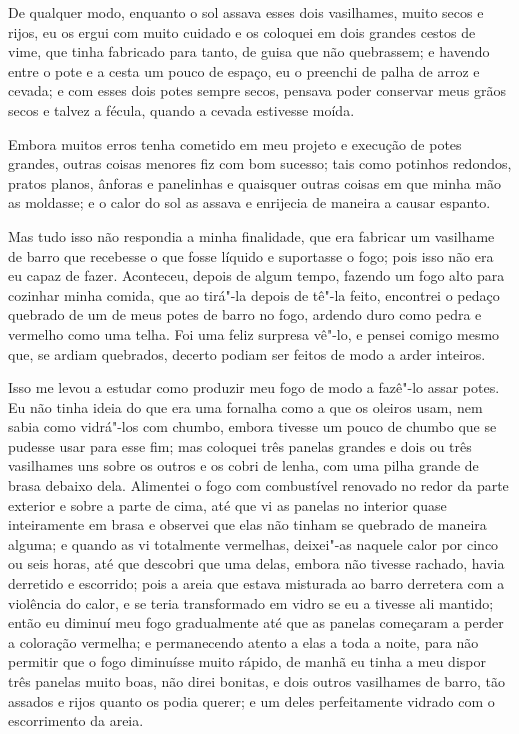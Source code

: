De qualquer modo, enquanto o sol assava esses dois vasilhames, muito
secos e rijos, eu os ergui com muito cuidado e os coloquei em dois
grandes cestos de vime, que tinha fabricado para tanto, de guisa que não
quebrassem; e havendo entre o pote e a cesta um pouco de espaço, eu o
preenchi de palha de arroz e cevada; e com esses dois potes sempre
secos, pensava poder conservar meus grãos secos e talvez a fécula,
quando a cevada estivesse moída.

Embora muitos erros tenha cometido em meu projeto e execução de potes
grandes, outras coisas menores fiz com bom sucesso; tais como potinhos
redondos, pratos planos, ânforas e panelinhas e quaisquer outras coisas
em que minha mão as moldasse; e o calor do sol as assava e enrijecia de
maneira a causar espanto.

Mas tudo isso não respondia a minha finalidade, que era fabricar um
vasilhame de barro que recebesse o que fosse líquido e suportasse o
fogo; pois isso não era eu capaz de fazer. Aconteceu, depois de algum
tempo, fazendo um fogo alto para cozinhar minha comida, que ao tirá"-la
depois de tê"-la feito, encontrei o pedaço quebrado de um de meus potes
de barro no fogo, ardendo duro como pedra e vermelho como uma telha. Foi
uma feliz surpresa vê"-lo, e pensei comigo mesmo que, se ardiam
quebrados, decerto podiam ser feitos de modo a arder inteiros.

Isso me levou a estudar como produzir meu fogo de modo a fazê"-lo assar
potes. Eu não tinha ideia do que era uma fornalha como a que os oleiros
usam, nem sabia como vidrá"-los com chumbo, embora tivesse um pouco de
chumbo que se pudesse usar para esse fim; mas coloquei três panelas
grandes e dois ou três vasilhames uns sobre os outros e os cobri de
lenha, com uma pilha grande de brasa debaixo dela. Alimentei o fogo com
combustível renovado no redor da parte exterior e sobre a parte de cima,
até que vi as panelas no interior quase inteiramente em brasa e observei
que elas não tinham se quebrado de maneira alguma; e quando as vi
totalmente vermelhas, deixei"-as naquele calor por cinco ou seis horas,
até que descobri que uma delas, embora não tivesse rachado, havia
derretido e escorrido; pois a areia que estava misturada ao barro
derretera com a violência do calor, e se teria transformado em vidro se
eu a tivesse ali mantido; então eu diminuí meu fogo gradualmente até que
as panelas começaram a perder a coloração vermelha; e permanecendo
atento a elas a toda a noite, para não permitir que o fogo diminuísse
muito rápido, de manhã eu tinha a meu dispor três panelas muito boas,
não direi bonitas, e dois outros vasilhames de barro, tão assados e
rijos quanto os podia querer; e um deles perfeitamente vidrado com o
escorrimento da areia.

